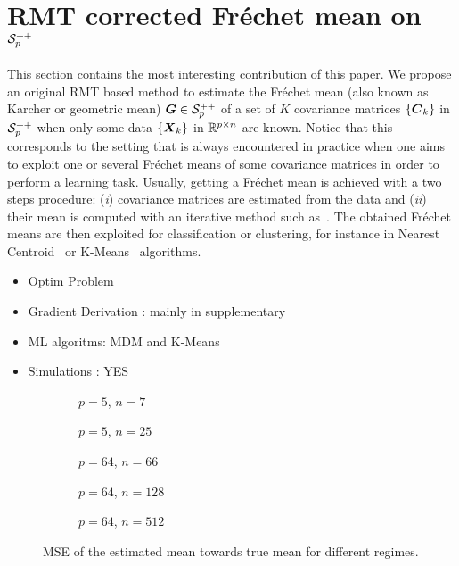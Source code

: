 \documentclass{article}
\theoremstyle{plain}
\theoremstyle{definition}
\theoremstyle{remark}
\begin{document}
\newpage

\section{RMT corrected Fréchet mean on $\mathcal{S}^{++}_{p}$}
\label{sec:mean}
This section contains the most interesting contribution of this paper.
We propose an original RMT based method to estimate the Fréchet mean (also known as Karcher or geometric mean) $\boldsymbol{G}\in\mathcal{S}^{++}_{p}$ of a set of $K$ covariance matrices $\{\boldsymbol{C}_k\}$ in $\mathcal{S}^{++}_{p}$ when only some data $\{\boldsymbol{X}_k\}$ in $\mathbb{R}^{p\times n}$ are known.
%
Notice that this corresponds to the setting that is always encountered in practice when one aims to exploit one or several Fréchet means of some covariance matrices in order to perform a learning task.
Usually, getting a Fréchet mean is achieved with a two steps procedure: (\emph{i}) covariance matrices are estimated from the data and (\emph{ii}) their mean is computed with an iterative method such as~\cite{}.
The obtained Fréchet means are then exploited for classification or clustering, for instance in Nearest Centroid~\cite{} or K-Means~\cite{} algorithms.


\begin{itemize}
    \item Optim Problem
    \item Gradient Derivation : mainly in supplementary
    \item ML algoritms: MDM and K-Means
    \item Simulations : YES
\end{itemize}



\begin{figure*}[t]
  \centering
  \begin{subfigure}{0.4\textwidth}
    
    \caption{$p=5$, $n=7$}
    \label{fig:subfiga}
  \end{subfigure}
  \begin{subfigure}{0.4\textwidth}
    
    \caption{$p=5$, $n=25$}
    \label{fig:subfigb}
  \end{subfigure}
  \begin{subfigure}{0.4\textwidth}
    
    \caption{$p=64$, $n=66$}
    \label{fig:subfiga}
  \end{subfigure}
  \begin{subfigure}{0.4\textwidth}
    
    \caption{$p=64$, $n=128$}
    \label{fig:subfigb}
  \end{subfigure}
  \begin{subfigure}{0.4\textwidth}
    
    \caption{$p=64$, $n=512$}
    \label{fig:subfigb}
  \end{subfigure}
  
  \caption{MSE of the estimated mean towards true mean for different regimes. }
  \label{fig:mainfig}
\end{figure*}
\end{document}
